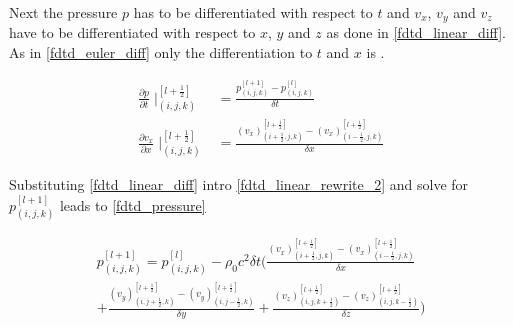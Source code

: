 Next the pressure $p$ has to be differentiated with respect to $t$ and $v_x$, $v_y$ and $v_z$ have to be differentiated with respect to $x$, $y$ and $z$ as done in \autoref{fdtd_linear_diff}. As in \autoref{fdtd_euler_diff} only the differentiation to $t$ and $x$ is \citep{Sakuma2014}.



\begin{subequations}\label{fdtd_linear_diff}
\begin{alignat}{2}
\frac{\partial p}{\partial t}\mid _{(i,j,k)}^{[l+\frac{1}{2}]} &= \frac{p_{(i,j,k)}^{[l+1]} -p_{(i,j,k)}^{[l]}}{\delta t} \label{fdtd_linear_diff_1}\\
\frac{\partial v_x}{\partial x}\mid _{(i,j,k)}^{[l+\frac{1}{2}]} &= \frac{(v_x)_{(i+\frac{1}{2},j,k)}^{[l+\frac{1}{2}]} -(v_x)_{(i-\frac{1}{2},j,k)}^{[l+\frac{1}{2}]}}{\delta x} \label{fdtd_euler_diff_2}
\end{alignat}
\end{subequations}


Substituting \autoref{fdtd_linear_diff} intro \autoref{fdtd_linear_rewrite_2} and solve for $p_{(i,j,k)}^{[l+1]}$ leads to  \autoref{fdtd_pressure}




\begin{multline}\label{fdtd_pressure}
p_{(i,j,k)}^{[l+1]} = p_{(i,j,k)}^{[l]} - \rho_0 c^2 \delta t \Biggl( \frac{(v_x)_{(i+\frac{1}{2},j,k)}^{[l+\frac{1}{2}]} - (v_x)_{(i-\frac{1}{2},j,k)}^{[l+\frac{1}{2}]}}{\delta x} \\ 
+ \frac{(v_y)_{(i,j+\frac{1}{2},k)}^{[l+\frac{1}{2}]}-(v_y)_{(i,j-\frac{1}{2},k)}^{[l+\frac{1}{2}]}}{\delta y} +  \frac{(v_z)_{(i,j,k+\frac{1}{2})}^{[l+\frac{1}{2}]}-(v_z)_{(i,j,k-\frac{1}{2})}^{[l+\frac{1}{2}]}}{\delta z} \Biggr)
\end{multline}

